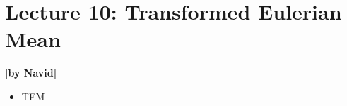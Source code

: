 
\section{Lecture 10: Transformed Eulerian Mean}\label{sec:lecture10}
\begin{flushright}\textbf{[by Navid]}\end{flushright}
  
 \begin{itemize}
   \item
   TEM
 \end{itemize}
